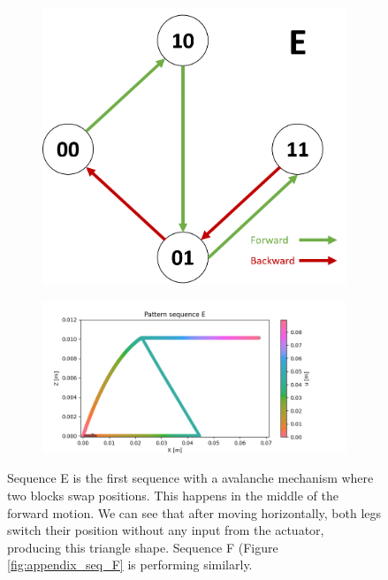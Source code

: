         \begin{figure}[h]
            \centering
            \begin{subfigure}{.2\textwidth}
            \includegraphics[width=\textwidth]{images/S_E.png}
            \end{subfigure}%
            \begin{subfigure}{.6\textwidth}
            \includegraphics[width=\textwidth]{images/E.png}
            \end{subfigure}
            \caption{Sequence E is the first sequence with a avalanche mechanism where two blocks swap positions. This happens in the middle of the forward motion. We can see that after moving horizontally, both legs switch their position without any input from the actuator, producing this triangle shape. Sequence F (Figure \ref{fig:appendix_seq_F} is performing similarly.}
        \end{figure}
        
